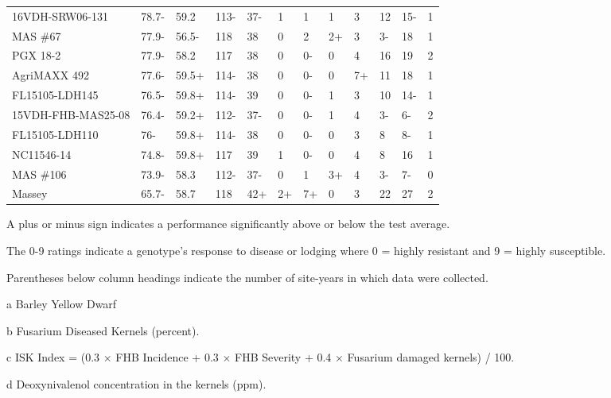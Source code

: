 \documentclass[12pt, letterpaper]{article}
\begin{document}
\begin{landscape}
\begin{ThreePartTable}
\begin{longtable}{llllllllllll}
  16VDH-SRW06-131 & 78.7- & 59.2 & 113- & 37- & 1 & 1 & 1 & 3 & 12 & 15- & 1 \\ 
  MAS \#67 & 77.9- & 56.5- & 118 & 38 & 0 & 2 & 2+ & 3 & 3- & 18 & 1 \\ 
  PGX 18-2 & 77.9- & 58.2 & 117 & 38 & 0 & 0- & 0 & 4 & 16 & 19 & 2 \\ 
  AgriMAXX 492 & 77.6- & 59.5+ & 114- & 38 & 0 & 0- & 0 & 7+ & 11 & 18 & 1 \\ 
  FL15105-LDH145 & 76.5- & 59.8+ & 114- & 39 & 0 & 0- & 1 & 3 & 10 & 14- & 1 \\ 
  15VDH-FHB-MAS25-08 & 76.4- & 59.2+ & 112- & 37- & 0 & 0- & 1 & 4 & 3- & 6- & 2 \\ 
  FL15105-LDH110 & 76- & 59.8+ & 114- & 38 & 0 & 0- & 0 & 3 & 8 & 8- & 1 \\ 
  NC11546-14 & 74.8- & 59.8+ & 117 & 39 & 1 & 0- & 0 & 4 & 8 & 16 & 1 \\ 
  MAS \#106 & 73.9- & 58.3 & 112- & 37- & 0 & 1 & 3+ & 4 & 3- & 7- & 0 \\ 
  Massey & 65.7- & 58.7 & 118 & 42+ & 2+ & 7+ & 0 & 3 & 22 & 27 & 2 \\ 
\end{longtable}
\end{ThreePartTable}

\newpage

\begin{ThreePartTable}
\begin{TableNotes}
\footnotesize
\item A plus or minus sign indicates a performance significantly above or below the test average.
\item The 0-9 ratings indicate a genotype's response to disease or lodging where 0 = highly resistant and 9 = highly susceptible.
\item Parentheses below column headings indicate the number of site-years in which data were collected.
\item [a] Barley Yellow Dwarf
\item [b] Fusarium Diseased Kernels (percent).
\item [c] ISK Index = (0.3 $\times$ FHB Incidence + 0.3 $\times$ FHB Severity + 0.4 $\times$ Fusarium damaged kernels) / 100.
\item [d] Deoxynivalenol concentration in the kernels (ppm).
\end{TableNotes}


\end{ThreePartTable}
\end{landscape}
\end{document}
